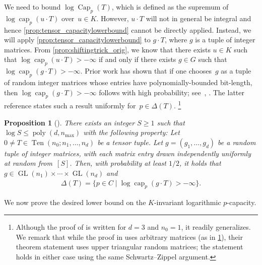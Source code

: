 \documentclass[11pt,letterpaper]{article}
\newtheorem{proposition}[theorem]{Proposition}\AddToHook{env/proposition/begin}{\crefalias{theorem}{proposition}}\crefname{proposition}{Proposition}{Propositions}
\numberwithin{equation}{section}
\DeclareMathOperator{\poly}{poly}
\DeclareMathOperator{\capacity}{cap}
\DeclareMathOperator{\Capacity}{Cap}
\DeclareMathOperator{\GL}{GL}
\DeclareMathOperator{\Ten}{Ten}
\begin{document}
\noindent
We need to bound $\log\Capacity_p(T)$, which is defined as the supremum of $\log\capacity_p(u \cdot T)$ over~$u \in K$.
However, $u \cdot T$ will not in general be integral and hence \cref{prop:tensor_capacitylowerbound} cannot be directly applied.
Instead, we will apply \cref{prop:tensor_capacitylowerbound} to $g \cdot T$, where $g$ is a tuple of integer matrices.
From \cref{prop:shiftingtrick_orig}, we know that there exists $u \in K$ such that $\log\capacity_p(u \cdot T) > -\infty$ if and only if there exists $g \in G$ such that $\log\capacity_p(g\cdot T)>-\infty$.
Prior work has shown that if one chooses~$g$ as a tuple of random integer matrices whose entries have polynomially-bounded bit-length, then $\log\capacity_p(g\cdot T) > -\infty$ follows with high probability; see~\cite[Cor.~2.7]{BFGOWW2018}, \cite[Thm.~3.6]{BCLNWZ2025computingmomentpolytopes}.
The latter reference states such a result uniformly for~$p \in \Delta(T)$.%
\footnote{Although the proof of \cite[Thm.~3.6]{BCLNWZ2025computingmomentpolytopes} is written for $d = 3$ and $n_0 = 1$, it readily generalizes.
We remark that while the proof in \cite{BCLNWZ2025computingmomentpolytopes} uses arbitrary matrices (as in \cref{prop:tensor_randomnessbound}), their theorem statement uses upper triangular random matrices; the statement holds in either case using the same Schwartz--Zippel argument.}

\begin{proposition}[{\cite[Thm.~3.6]{BCLNWZ2025computingmomentpolytopes}}]\label{prop:tensor_randomnessbound}
    There exists an integer $S\geq1$ such that~$\log S \leq \poly(d, n_{\max})$ with the following property:
    Let $0 \neq T \in \Ten(n_0; n_1, \ldots, n_d)$ be a tensor tuple.
    Let $g=(g_1, \ldots, g_d)$ be a random tuple of integer matrices, with each matrix entry drawn independently uniformly at random from~$[S]$.
    Then, with probability at least $1/2$, it holds that $g \in \GL(n_1) \times \cdots \times \GL(n_d)$ and
    \begin{align*}
        \Delta(T) = \{ p \in C \mid \log\capacity_p(g \cdot T) > -\infty \}.
    \end{align*}
\end{proposition}

We now prove the desired lower bound on the $K$-invariant logarithmic $p$-capacity.
\end{document}
